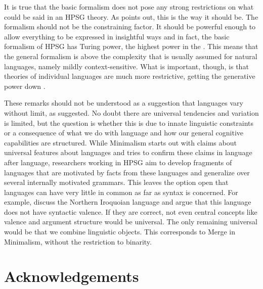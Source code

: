 \documentclass[output=paper
	        ,collection
	        ,collectionchapter
 	        ,biblatex
                ,babelshorthands
                ,newtxmath
                ,draftmode
                ,colorlinks, citecolor=brown
]{langscibook}
\begin{document}
It is true that
the basic formalism does not pose any strong restrictions on what could be said in an HPSG
theory. As \citet{Pollard96a} points out, this is the way it should be. The formalism should not be
the constraining factor. It should be powerful enough to allow everything to be expressed in
insightful ways and in fact, the basic formalism of HPSG has Turing power, the highest power in the
 \citep{Pollard99a}. This means that the general formalism is above the complexity that is usually
assumed for natural languages, namely mildly context-sensitive. What is important, though, is that theories of individual languages are much more
restrictive, getting the generative power down \citep[Chapter~17]{MuellerGT-Eng1}. 

These remarks should not be understood as a suggestion that languages vary without limit, as
\citet[]{Joos58a} suggested. No doubt there are universal tendencies and variation
is limited, but the question is whether this is due to innate linguistic constraints or a
consequence of what we do with language and how our general cognitive capabilities are structured. 
While Minimalism starts out with claims about universal features about languages and tries to
confirm these claims in language after language, researchers working in HPSG aim to develop
fragments of languages that are motivated by facts from these languages and generalize over several
internally motivated grammars. This leaves the option open that languages can have very little in
common as far as syntax is concerned. For example, \citet{KM2012a} discuss the Northern Iroquoian language  and argue that this language
does not have syntactic valence. If they are correct, not even central concepts like valence and
argument structure would be universal. The only remaining universal would be that we combine
linguistic objects. This corresponds to Merge in Minimalism, without the restriction to binarity.



\section*{Acknowledgements}
\end{document}
